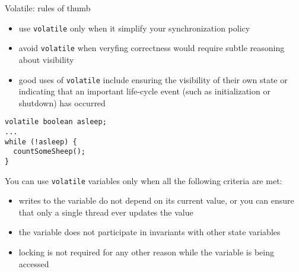 \begin{frame}[t,fragile]{Volatile: rules of thumb}

\begin{itemize}
  \pause \item use \texttt{volatile} only when it simplify your synchronization policy
  \pause \item avoid \texttt{volatile} when veryfing correctness would require subtle reasoning about visibility
  \pause \item good uses of \texttt{volatile} include ensuring the visibility of their own state or indicating that an important life-cycle event (such as initialization or shutdown) has occurred
\end{itemize}

\pause
\begin{verbatim}
volatile boolean asleep;
...
while (!asleep) {
  countSomeSheep();
}
\end{verbatim}

\pause
You can use \texttt{volatile} variables only when all the following criteria are met:
\begin{itemize}
  \pause \item writes to the variable do not depend on its current value, or you can ensure that only a single thread ever updates the value
  \pause \item the variable does not participate in invariants with other state variables
  \pause \item locking is not required for any other reason while the variable is being accessed
\end{itemize}

\end{frame}

% 
% 
% 
% 
% 
% 
% 


